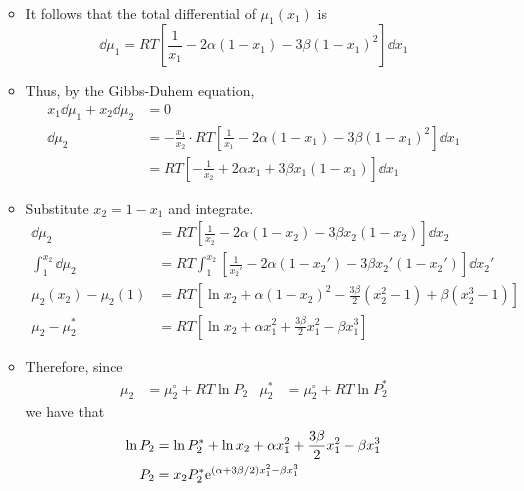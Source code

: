 \documentclass[../notes.tex]{subfiles}
\begin{document}
\begin{itemize}
\begin{itemize}
\begin{align*}
        \end{align*}
        \item It follows that the total differential of $\mu_1(x_1)$ is
        \begin{equation*}
            \dd{\mu_1} = RT\left[ \frac{1}{x_1}-2\alpha(1-x_1)-3\beta(1-x_1)^2 \right]\dd{x_1}
        \end{equation*}
        \item Thus, by the Gibbs-Duhem equation,
        \begin{align*}
            x_1\dd{\mu_1}+x_2\dd{\mu_2} &= 0\\
            \dd{\mu_2} &= -\frac{x_1}{x_2}\cdot RT\left[ \frac{1}{x_1}-2\alpha(1-x_1)-3\beta(1-x_1)^2 \right]\dd{x_1}\\
            &= RT\left[ -\frac{1}{x_2}+2\alpha x_1+3\beta x_1(1-x_1) \right]\dd{x_1}
        \end{align*}
        \item Substitute $x_2=1-x_1$ and integrate.
        \begin{align*}
            \dd{\mu_2} &= RT\left[ \frac{1}{x_2}-2\alpha(1-x_2)-3\beta x_2(1-x_2) \right]\dd{x_2}\\
            \int_1^{x_2}\dd{\mu_2} &= RT\int_1^{x_2}\left[ \frac{1}{x_2'}-2\alpha(1-x_2')-3\beta x_2'(1-x_2') \right]\dd{x_2'}\\
            \mu_2(x_2)-\mu_2(1) &= RT\left[ \ln x_2+\alpha(1-x_2)^2-\frac{3\beta}{2}(x_2^2-1)+\beta(x_2^3-1) \right]\\
            \mu_2-\mu_2^* &= RT\left[ \ln x_2+\alpha x_1^2+\frac{3\beta}{2}x_1^2-\beta x_1^3 \right]
        \end{align*}
        \item Therefore, since
        \begin{align*}
            \mu_2 &= \mu_2^\circ+RT\ln P_2&
            \mu_2^* &= \mu_2^\circ+RT\ln P_2^*
        \end{align*}
        we have that
        \begin{align*}
            \ln P_2 &= \ln P_2^*+\ln x_2+\alpha x_1^2+\frac{3\beta}{2}x_1^2-\beta x_1^3\\
            P_2 &= x_2P_2^*\e[(\alpha+3\beta/2)x_1^2-\beta x_1^3]
        \end{align*}
    \end{itemize}
\end{itemize}
\end{document}
